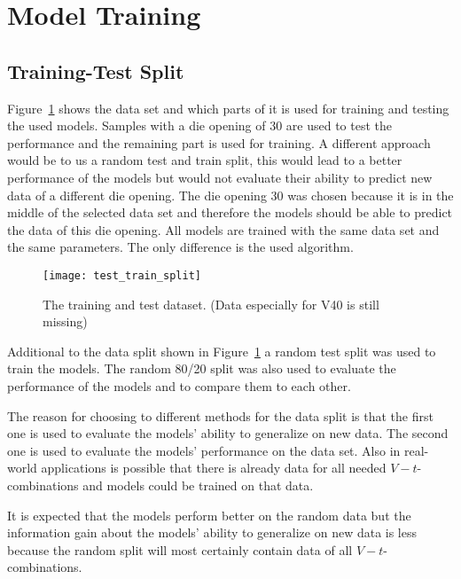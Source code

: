 \label{sec:model-training}


\section{Model Training}

\subsection{Training-Test Split}
Figure~\ref{fig:train_test_split} shows the data set and which parts of it is used for training
and testing the used
models. Samples with a die opening of 30 are used to test the performance and the remaining part
is used for training.
A different approach would be to us a random test and train split, this would lead to a better
performance of the
models but would not evaluate their ability to predict new data of a different die opening.
The die opening 30 was chosen because it is in the middle of the selected data set and therefore
the models should be
able to predict the data of this die opening.
All models are trained with the same data set and the same parameters. The only difference is the
used algorithm.

\begin{figure}[H]
    \begin{tcolorbox}[arc=0pt,boxrule=0.5pt]
        \centering
        \texttt{[image: test\_train\_split]}
        \caption{The training and test dataset. (Data especially for V40 is still missing)}
        \label{fig:train_test_split}
    \end{tcolorbox}
\end{figure}

Additional to the data split shown in Figure~\ref{fig:train_test_split} a random test split was
used to train the
models. The random 80/20 split was also used to evaluate the performance of the models and to
compare them to each
other.

The reason for choosing to different methods for the data split is that the first one is used to
evaluate the models'
ability to generalize on new data. The second one is used to evaluate the models' performance on
the data set.
Also in real-world applications is possible that there is already data for all needed
$V-t$-combinations and models
could be trained on that data.

It is expected that the models perform better on the random data but the information gain about
the models' ability
to generalize on new data is less because the random split will most certainly contain data of
all $V-t$-combinations.

